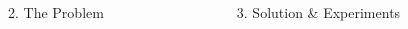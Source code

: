 \documentclass[final]{beamer}
\begin{document}
\begin{frame}[t]
\begin{columns}[t,totalwidth=\textwidth]
\begin{column}{0.33\textwidth}
\begin{block}{2. The Problem}
            \end{block}
        \end{column}
  

    \begin{column}{0.33\textwidth}
      \begin{block}{3. Solution \& Experiments}
      \end{block}
    \end{column}

  \end{columns}

\end{frame}
\end{document}
